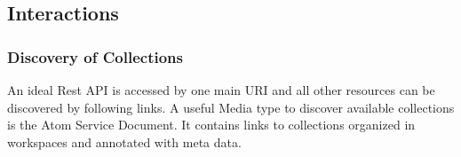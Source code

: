 \documentclass[12pt,a4paper,twoside]{scrartcl}		%
\begin{document}


\subsection{Interactions}
\label{sec:interactions}
\subsubsection{Discovery of Collections}
\label{sec:disc-coll}

An ideal Rest API is accessed by one main URI and all other resources can be
discovered by following links. A useful Media type to discover available
collections is the Atom Service Document\cite[sec. 8]{RFC5023}. It contains
links to collections organized in workspaces and annotated with meta data.
\end{document}
